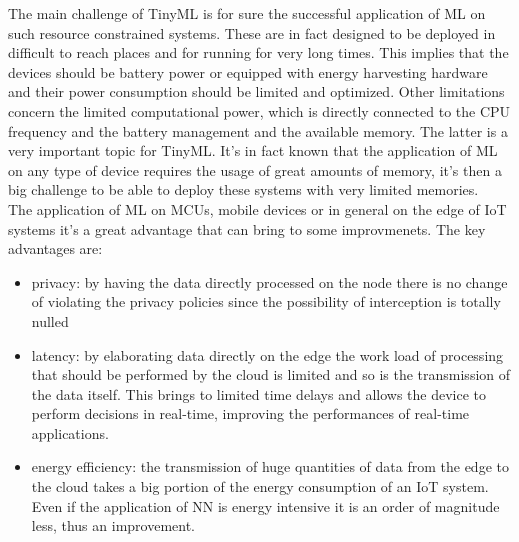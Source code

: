 \documentclass[12pt]{report}
\begin{document}
The main challenge of TinyML is for sure the successful application of ML on such resource constrained systems. These are in fact designed to be deployed in difficult to reach places and for running for very long times. This implies that the devices should be battery power or equipped with energy harvesting hardware and their power consumption should be limited and optimized. Other limitations concern the limited computational power, which is directly connected to the CPU frequency and the battery management and the available memory. The latter is a very important topic for TinyML. It's in fact known that the application of ML on any type of device requires the usage of great amounts of memory, it's then a big challenge to be able to deploy these systems with very limited memories.\\
The application of ML on MCUs, mobile devices or in general on the edge of IoT systems it's a great advantage that can bring to some improvmenets. The key advantages are:
\begin{itemize}
\item privacy: by having the data directly processed on the node there is no change of violating the privacy policies since the possibility of interception is totally nulled
\item latency: by elaborating data directly on the edge the work load of processing that should be performed by the cloud is limited and so is the transmission of the data itself. This brings to limited time delays and allows the device to perform decisions in real-time, improving the performances of real-time applications.
\item energy efficiency: the transmission of huge quantities of data from the edge to the cloud takes a big portion of the energy consumption of an IoT system. Even if the application of NN is energy intensive it is an order of magnitude less, thus an improvement.
\end{itemize}
\end{document}
